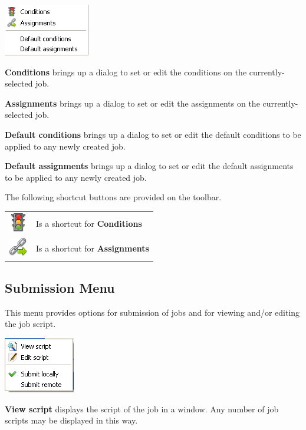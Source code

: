 \includegraphics{img/btrwcondmenu.png} 

\textbf{Conditions} brings up a dialog to set or edit the conditions on the currently-selected job.

\textbf{Assignments} brings up a dialog to set or edit the assignments on the currently-selected job.

\textbf{Default conditions} brings up a dialog to set or edit the default conditions to be applied to any
newly created job.

\textbf{Default assignments} brings up a dialog to set or edit the default assignments to be applied to any
newly created job.

The following shortcut buttons are provided on the toolbar.

\begin{tabular}{l p{12cm}}
\includegraphics{img/btqwcond.png} & Is a shortcut for \textbf{Conditions}\\
\includegraphics{img/btqwass.png} & Is a shortcut for \textbf{Assignments}\\
\end{tabular}

\subsection{Submission Menu}
This menu provides options for submission of jobs and for viewing and/or editing the job script.

\includegraphics{img/btrwsubmenu.png} 

\textbf{View script} displays the script of the job in a window. Any number of job scripts may be displayed in this way.

